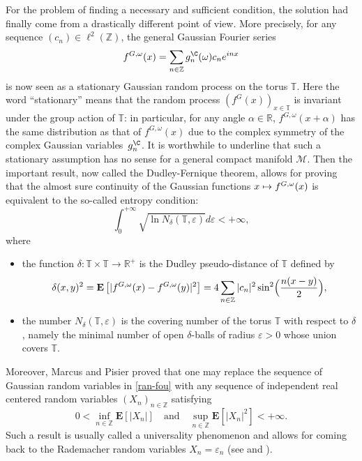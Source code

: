 \documentclass[JEP,XML,SOM,Unicode,NoEqCountersInSection,published]{cedram}
\def\mto{\mathchoice{\longmapsto}{\mapsto}{\mapsto}{\mapsto}}
\theoremstyle{theorem}
\theoremstyle{definition}
\newcommand\R{\mathbb{R}}
\newcommand\E{\mathbf{E}}
\newcommand\Z{\mathbb{Z}}
\newcommand\T{\mathbb{T}}
\newcommand\ep{\varepsilon}
\begin{document}
For the problem of finding a necessary and sufficient condition, the solution had finally come from a drastically different point of view. More precisely, for any sequence $(c_n)\in \ell^2(\Z)$, the general Gaussian Fourier series
\begin{equation}\label{ran-fou}
f^{G,\omega}(x)=\sum_{n\in \Z} g_n^{\C}(\omega) c_n e^{inx}
\end{equation}
is now seen as a stationary Gaussian random process on the torus $\mathbb{T}$.
Here the word ``stationary'' means that the random process $(f^{G}(x))_{x\in \mathbb{T}}$ is invariant under the group action of $\mathbb{T}$: in particular, for any angle $\alpha \in \R$, $f^{G,\omega}(x+\alpha)$ has the same distribution as that of $f^{G,\omega}(x)$ due to the complex symmetry of the complex Gaussian variables~$g_n^\C$.
It is worthwhile to underline that such a stationary assumption has no sense for a general compact manifold $\mathcal{M}$.
Then the important result, now called the Dudley-Fernique theorem, allows for proving that the almost sure continuity of the Gaussian functions
$x\mto f^{G,\omega}(x)$ is equivalent to the so-called entropy condition:
\begin{equation}\label{entrop}
\int_{0}^{+\infty} \sqrt{\ln N_{\delta}(\T,\ep)} d\ep<+\infty,
\end{equation}
\enlargethispage{-2\baselineskip}%
where
\begin{itemize}
\item the function $\delta:\mathbb{T}\times \mathbb{T}\to \R^+$ is the Dudley pseudo-distance of $\mathbb{T}$ defined by\vspace*{-3pt}
\begin{equation*}
\delta(x,y)^2 =\E\left[| f^{G,\omega}(x)-f^{G,\omega}(y)|^2\right]=4\sum_{n\in \Z} |c_n|^2 \sin^2\Bigl(\frac{n(x-y)}{2}\Bigr),
\end{equation*}
\item the number $N_{\delta}(\T,\ep)$ is the covering number of the torus $\mathbb{T}$ with respect to $\delta$, namely the minimal number of open $\delta$-balls of radius $\ep>0$ whose union covers $\mathbb{T}$.
\end{itemize}
Moreover, Marcus and Pisier proved that one may replace the sequence of Gaussian random variables in \eqref{ran-fou} with any sequence of independent real centered random variables $(X_n)_{n\in \Z}$ satisfying\vspace*{-3pt}
\begin{equation*}
0<\inf_{n\in \Z}\E[|X_n|] \quad \text{and} \quad \sup_{n\in \Z} \E[|X_n|^2]<+\infty.
\end{equation*}
Such a result is usually called a universality phenomenon and allows for coming back to the Rademacher random variables $X_n=\ep_n$ (see \cite[p.\,7--9]{pisier1981} and \cite[p.\,28, Cor.\,7.3]{pisier1977}).
\end{document}

